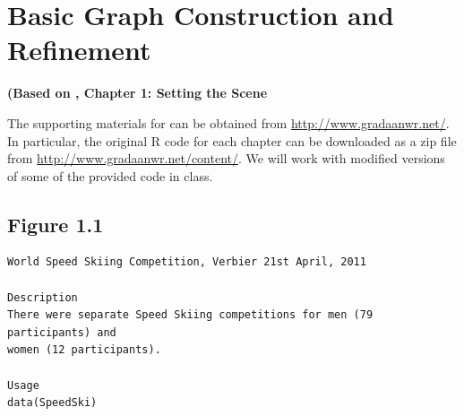 \documentclass[12pt,letterpaper,final]{article}
\begin{document}

\def\jsprivatechunwinone{1} %



\section{Basic Graph Construction and Refinement}

{\bf (Based on \cite{Un2015}, Chapter 1: Setting the Scene}

The supporting materials for \cite{Un2015} can be obtained from
\url{http://www.gradaanwr.net/}.
In particular, the original R code for each chapter can be downloaded
as a zip file from
\url{http://www.gradaanwr.net/content/}.
We will work with modified versions of some of the provided code in class.


\subsection{Figure 1.1}


\begin{verbatim}
World Speed Skiing Competition, Verbier 21st April, 2011

Description
There were separate Speed Skiing competitions for men (79 participants) and 
women (12 participants).

Usage
data(SpeedSki)
\end{verbatim}
\end{document}
